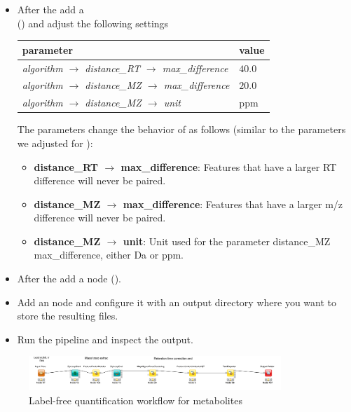 \begin{itemize}
\item
After the  add a  \\
 () and adjust the following settings

\begin{center}
\begin{tabular}{l|l}
\textbf{parameter} & \textbf{value} \\ \hline
\textit{algorithm $\rightarrow$ distance\_RT $\rightarrow$ max\_difference} & $40.0$ \\
\textit{algorithm $\rightarrow$ distance\_MZ $\rightarrow$ max\_difference} & $20.0$ \\
\textit{algorithm $\rightarrow$ distance\_MZ $\rightarrow$ unit} & ppm
\end{tabular}
\end{center}

\noindent The parameters change the behavior of  as follows (similar to the parameters we adjusted for ):
\begin{itemize}
\item \textbf{distance\_RT $\rightarrow$ max\_difference}: Features that have a larger RT difference will never be paired.
\item \textbf{distance\_MZ $\rightarrow$ max\_difference}: Features that have a larger m/z difference will never be paired.
\item \textbf{distance\_MZ $\rightarrow$ unit}: Unit used for the parameter distance\_MZ max\_difference, either Da or ppm.
\end{itemize}

\item
After the  add a  node ().
\item
Add an  node and configure it with an output directory where you want to store the resulting files.
\item
Run the pipeline and inspect the output.
\end{itemize}

\begin{figure}[htbp]
  \centering
  \includegraphics[width=0.85\textwidth]{graphics/metabo/metabo_part1}
  \caption{Label-free quantification workflow for metabolites}
  \label{fig:metabo_part1}
\end{figure}

